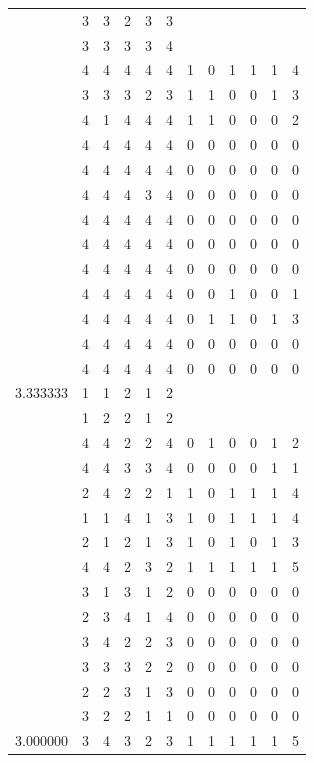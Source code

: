\documentclass[]{book}
\theoremstyle{definition}
\theoremstyle{definition}
\theoremstyle{definition}
\theoremstyle{remark}
\begin{document}
\begin{table}
{\begin{tabular}[t]{rrrrrrrrrrrr}
 & 3 & 3 & 2 & 3 & 3 &  &  &  &  &  & \\
 & 3 & 3 & 3 & 3 & 4 &  &  &  &  &  & \\
 & 4 & 4 & 4 & 4 & 4 & 1 & 0 & 1 & 1 & 1 & 4\\
 & 3 & 3 & 3 & 2 & 3 & 1 & 1 & 0 & 0 & 1 & 3\\
 & 4 & 1 & 4 & 4 & 4 & 1 & 1 & 0 & 0 & 0 & 2\\
 & 4 & 4 & 4 & 4 & 4 & 0 & 0 & 0 & 0 & 0 & 0\\
 & 4 & 4 & 4 & 4 & 4 & 0 & 0 & 0 & 0 & 0 & 0\\
 & 4 & 4 & 4 & 3 & 4 & 0 & 0 & 0 & 0 & 0 & 0\\
 & 4 & 4 & 4 & 4 & 4 & 0 & 0 & 0 & 0 & 0 & 0\\
 & 4 & 4 & 4 & 4 & 4 & 0 & 0 & 0 & 0 & 0 & 0\\
 & 4 & 4 & 4 & 4 & 4 & 0 & 0 & 0 & 0 & 0 & 0\\
 & 4 & 4 & 4 & 4 & 4 & 0 & 0 & 1 & 0 & 0 & 1\\
 & 4 & 4 & 4 & 4 & 4 & 0 & 1 & 1 & 0 & 1 & 3\\
 & 4 & 4 & 4 & 4 & 4 & 0 & 0 & 0 & 0 & 0 & 0\\
 & 4 & 4 & 4 & 4 & 4 & 0 & 0 & 0 & 0 & 0 & 0\\
3.333333 & 1 & 1 & 2 & 1 & 2 &  &  &  &  &  & \\
 & 1 & 2 & 2 & 1 & 2 &  &  &  &  &  & \\
 & 4 & 4 & 2 & 2 & 4 & 0 & 1 & 0 & 0 & 1 & 2\\
 & 4 & 4 & 3 & 3 & 4 & 0 & 0 & 0 & 0 & 1 & 1\\
 & 2 & 4 & 2 & 2 & 1 & 1 & 0 & 1 & 1 & 1 & 4\\
 & 1 & 1 & 4 & 1 & 3 & 1 & 0 & 1 & 1 & 1 & 4\\
 & 2 & 1 & 2 & 1 & 3 & 1 & 0 & 1 & 0 & 1 & 3\\
 & 4 & 4 & 2 & 3 & 2 & 1 & 1 & 1 & 1 & 1 & 5\\
 & 3 & 1 & 3 & 1 & 2 & 0 & 0 & 0 & 0 & 0 & 0\\
 & 2 & 3 & 4 & 1 & 4 & 0 & 0 & 0 & 0 & 0 & 0\\
 & 3 & 4 & 2 & 2 & 3 & 0 & 0 & 0 & 0 & 0 & 0\\
 & 3 & 3 & 3 & 2 & 2 & 0 & 0 & 0 & 0 & 0 & 0\\
 & 2 & 2 & 3 & 1 & 3 & 0 & 0 & 0 & 0 & 0 & 0\\
 & 3 & 2 & 2 & 1 & 1 & 0 & 0 & 0 & 0 & 0 & 0\\
3.000000 & 3 & 4 & 3 & 2 & 3 & 1 & 1 & 1 & 1 & 1 & 5\\

\end{tabular}}
\end{table}
\end{document}
